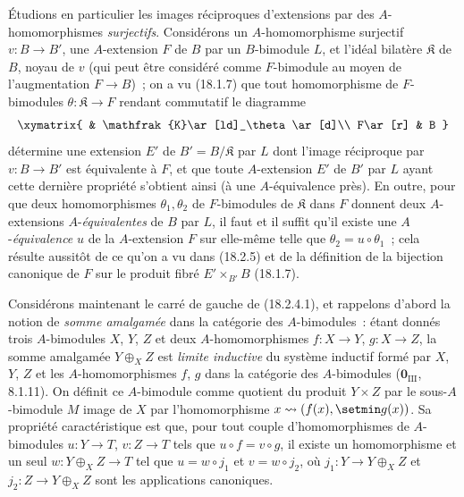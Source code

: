 \begin{env}[18.2.6]
\label{0.18.2.6-fr}
Étudions en particulier les images réciproques d'extensions par des
$A$-homomorphismes \emph{surjectifs}. Considérons un $A$-homomorphisme
surjectif $v:B\to B'$, une $A$-extension $F$ de $B$ par un $B$-bimodule $L$,
et l'idéal bilatère $\mathfrak{K}$ de $B$, noyau de $v$ (qui peut être
considéré comme $F$-bimodule au moyen de l'augmentation $F\to B$)~; on a vu
(18.1.7) que tout homomorphisme de $F$-bimodules
$\theta:\mathfrak{K}\to F$ rendant commutatif le diagramme
\[
  \xymatrix{
    & \mathfrak{K}\ar[ld]_\theta\ar[d]\\
    F\ar[r] & B
  }
\]
détermine une extension $E'$ de $B'=B/\mathfrak{K}$ par $L$ dont l'image
réciproque par $v:B\to B'$ est équivalente à $F$, et que toute $A$-extension
$E'$ de $B'$ par $L$ ayant cette dernière propriété s'obtient ainsi (à une
$A$-équivalence près). En outre, pour que deux homomorphismes
$\theta_1,\theta_2$ de $F$-bimodules de $\mathfrak{K}$ dans $F$ donnent deux
  $A$-extensions $A$-\emph{équivalentes} de $B$ par $L$, il faut et il suffit qu'il
existe une $A$-\emph{équivalence} $u$ de la $A$-extension $F$ sur elle-même telle que
$\theta_2=u\circ\theta_1$~; cela résulte aussitôt de ce qu'on a vu dans
(18.2.5) et de la définition de la bijection canonique de $F$ sur le produit
fibré $E'\times_{B'}B$ (18.1.7).
\end{env}

\begin{env}[18.2.7]
\label{0.18.2.7-fr}
Considérons maintenant le carré de gauche de (18.2.4.1), et rappelons d'abord
la notion de \emph{somme amalgamée} dans la catégorie des $A$-bimodules~:
étant donnés trois $A$-bimodules $X$, $Y$, $Z$ et deux $A$-homomorphismes
$f:X\to Y$, $g:X\to Z$, la somme amalgamée $Y\oplus_XZ$ est \emph{limite
inductive} du système inductif formé par $X$, $Y$, $Z$ et les
$A$-homomorphismes $f$, $g$ dans la catégorie des $A$-bimodules
($\mathbf{0}_{\mathrm{III}}$, 8.1.11). On définit ce $A$-bimodule comme quotient du
produit $Y\times Z$ par le sous-$A$-bimodule $M$ image de $X$ par
l'homomorphisme $x\leadsto(f(x),\setmin g(x))$. Sa propriété caractéristique est que,
pour tout couple d'homomorphismes de $A$-bimodules $u:Y\to T$, $v:Z\to T$
tels que $u\circ f=v\circ g$, il existe un homomorphisme et un seul
$w:Y\oplus_XZ\to T$ tel que $u=w\circ j_1$ et $v=w\circ j_2$, où
$j_1:Y\to Y\oplus_XZ$ et $j_2:Z\to Y\oplus_XZ$ sont les applications
canoniques.
\end{env}

